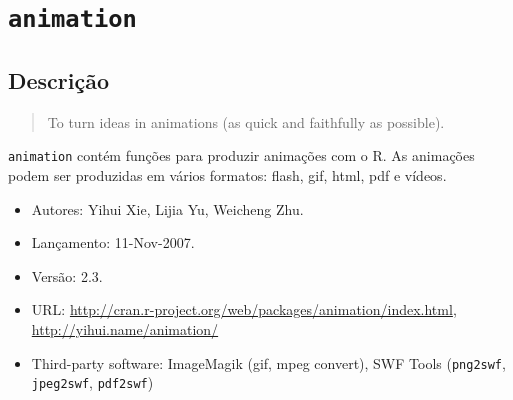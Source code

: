 \section{\texttt{animation}}


\subsection{Descrição}

\begin{frame}

  \begin{quote}
    To turn ideas in animations (as quick and faithfully as possible).
  \end{quote}

  \texttt{animation} contém funções para produzir
  animações com o R. As animações podem ser produzidas em vários
  formatos: flash, gif, html, pdf e vídeos.

  \begin{itemize}
  \item Autores: Yihui Xie, Lijia Yu, Weicheng Zhu.
  \item Lançamento: 11-Nov-2007.
  \item Versão: 2.3.
  \item URL:
    \url{http://cran.r-project.org/web/packages/animation/index.html},
    \url{http://yihui.name/animation/}
  \item Third-party software: ImageMagik (gif, mpeg convert), SWF Tools
    (\texttt{png2swf}, \texttt{jpeg2swf}, \texttt{pdf2swf})
  \end{itemize}

\end{frame}


